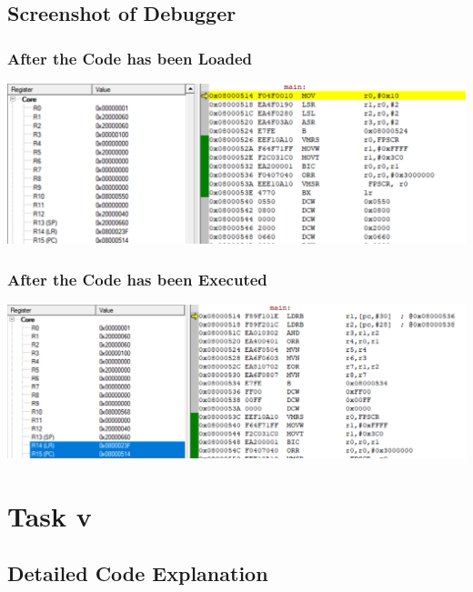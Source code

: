 \documentclass{article}
\begin{document}
\subsection{Screenshot of Debugger}


\subsubsection{After the Code has been Loaded}

\begin{center}
    \includegraphics[width=1\textwidth]{Shift_Operation_Before.png}
\end{center}

\subsubsection{After the Code has been Executed}

\begin{center}
    \includegraphics[width=1.3\textwidth]{Shift_Operation_After.png}
\end{center}

\section{Task v} 

\subsection{Detailed Code Explanation}
\end{document}
